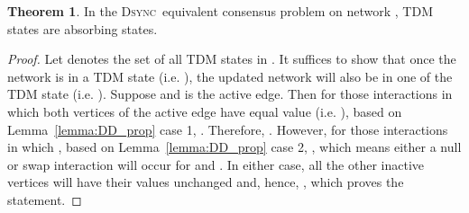 \documentclass[conference]{IEEEtran}
\newcommand{\DDD}{\textsc{Dsync~}}
\theoremstyle{definition}
\theoremstyle{definition}
\newtheorem{theorem}{Theorem}
\begin{document}
\begin{theorem}\label{thm:AS}
In the \DDD equivalent consensus problem on network , TDM states are absorbing states.
\end{theorem}
\begin{proof}
Let  denotes the set of all TDM states in .
It suffices to show that once the network is in a TDM state (i.e. ), the updated network will also be in one of the TDM state (i.e. ).
Suppose  and  is the active edge. Then for those interactions in which both vertices of the active edge have equal value (i.e. ), based on Lemma~\ref{lemma:DD_prop} case 1, . Therefore, . However, for those interactions in which , based on Lemma~\ref{lemma:DD_prop} case 2, , which means either a null or swap interaction will occur for  and . In either case, all the other inactive vertices will have their values unchanged and, hence, , which proves the statement. 
\end{proof}
\end{document}
